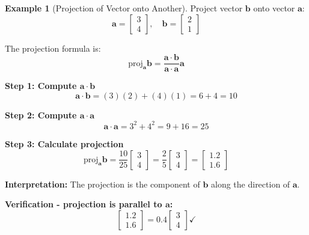 \documentclass[12pt,a4paper]{article}
\theoremstyle{definition}
\newtheorem{example}{Example}[section]
\begin{document}
\begin{example}[Projection of Vector onto Another]
Project vector $\mathbf{b}$ onto vector $\mathbf{a}$:
\begin{equation}
\mathbf{a} = \begin{bmatrix} 3 \\ 4 \end{bmatrix}, \quad
\mathbf{b} = \begin{bmatrix} 2 \\ 1 \end{bmatrix}
\end{equation}

The projection formula is:
\begin{equation}
\text{proj}_{\mathbf{a}}\mathbf{b} = \frac{\mathbf{a} \cdot \mathbf{b}}{\mathbf{a} \cdot \mathbf{a}} \mathbf{a}
\end{equation}

\textbf{Step 1: Compute $\mathbf{a} \cdot \mathbf{b}$}
\begin{equation}
\mathbf{a} \cdot \mathbf{b} = (3)(2) + (4)(1) = 6 + 4 = 10
\end{equation}

\textbf{Step 2: Compute $\mathbf{a} \cdot \mathbf{a}$}
\begin{equation}
\mathbf{a} \cdot \mathbf{a} = 3^2 + 4^2 = 9 + 16 = 25
\end{equation}

\textbf{Step 3: Calculate projection}
\begin{equation}
\text{proj}_{\mathbf{a}}\mathbf{b} = \frac{10}{25} \begin{bmatrix} 3 \\ 4 \end{bmatrix} = \frac{2}{5} \begin{bmatrix} 3 \\ 4 \end{bmatrix} = \begin{bmatrix} 1.2 \\ 1.6 \end{bmatrix}
\end{equation}

\textbf{Interpretation:} The projection is the component of $\mathbf{b}$ along the direction of $\mathbf{a}$.

\textbf{Verification - projection is parallel to $\mathbf{a}$:}
\begin{equation}
\begin{bmatrix} 1.2 \\ 1.6 \end{bmatrix} = 0.4 \begin{bmatrix} 3 \\ 4 \end{bmatrix} \checkmark
\end{equation}
\end{example}
\end{document}
